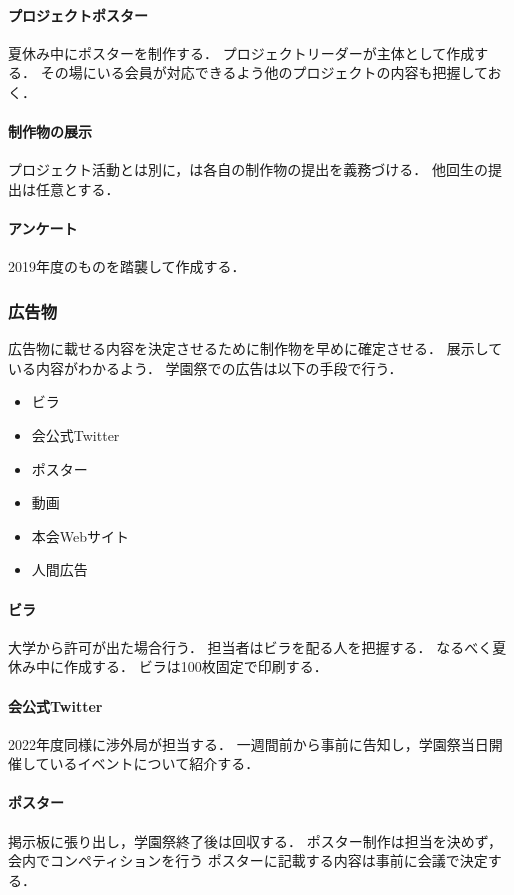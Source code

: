 \paragraph{プロジェクトポスター}
夏休み中にポスターを制作する．
プロジェクトリーダーが主体として作成する．
その場にいる会員が対応できるよう他のプロジェクトの内容も把握しておく．

\paragraph{制作物の展示}
プロジェクト活動とは別に\secondGrade{}，\thirdGrade{}は各自の制作物の提出を義務づける．
他回生の提出は任意とする．

\paragraph{アンケート}
2019年度のものを踏襲して作成する．

\subsubsection*{広告物}
広告物に載せる内容を決定させるために制作物を早めに確定させる．
展示している内容がわかるよう．
学園祭での広告は以下の手段で行う．
\begin{itemize}
    \item ビラ
    \item 会公式Twitter
    \item ポスター
    \item 動画
    \item 本会Webサイト
    \item 人間広告
\end{itemize}

\paragraph{ビラ}
大学から許可が出た場合行う．
担当者はビラを配る人を把握する．
なるべく夏休み中に作成する．
ビラは100枚固定で印刷する．

\paragraph{会公式Twitter}
2022年度同様に渉外局が担当する．
一週間前から事前に告知し，学園祭当日開催しているイベントについて紹介する．

\paragraph{ポスター}
掲示板に張り出し，学園祭終了後は回収する．
ポスター制作は担当を決めず，会内でコンペティションを行う
ポスターに記載する内容は事前に会議で決定する．

